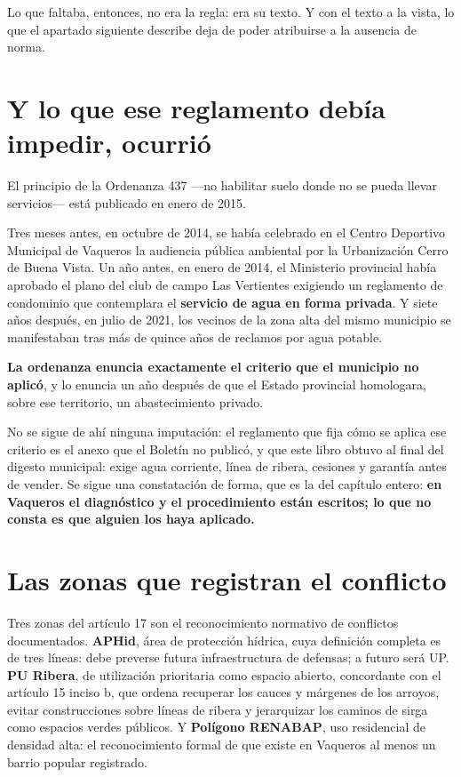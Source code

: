 Lo que faltaba, entonces, no era la regla: era su texto. Y con el texto a la vista, lo que el apartado siguiente describe deja de poder atribuirse a la ausencia de norma.


\section{Y lo que ese reglamento debía impedir, ocurrió}

El principio de la Ordenanza 437 ---no habilitar suelo donde no se pueda llevar servicios--- está publicado en
enero de 2015.

Tres meses antes, en octubre de 2014, se había celebrado en el Centro Deportivo Municipal de
Vaqueros la audiencia pública ambiental por la Urbanización Cerro de Buena Vista. Un año
antes, en enero de 2014, el Ministerio provincial había aprobado el plano del club de campo
Las Vertientes exigiendo un reglamento de condominio que contemplara el \textbf{servicio de
agua en forma privada}. Y siete años después, en julio de 2021, los vecinos de la zona alta
del mismo municipio se manifestaban tras más de quince años de reclamos por agua potable.

\textbf{La ordenanza enuncia exactamente el criterio que el municipio no aplicó}, y lo enuncia
un año después de que el Estado provincial homologara, sobre ese territorio, un
abastecimiento privado.

No se sigue de ahí ninguna imputación: el reglamento que fija cómo se aplica ese criterio es
el anexo que el Boletín no publicó, y que este libro obtuvo al final del digesto municipal:
exige agua corriente, línea de ribera, cesiones y garantía antes de vender. Se sigue una
constatación de forma, que es la del capítulo entero: \textbf{en Vaqueros el diagnóstico y el
procedimiento están escritos; lo que no consta es que alguien los haya aplicado.}

\section{Las zonas que registran el conflicto}

Tres zonas del artículo 17 son el reconocimiento normativo de conflictos documentados. \textbf{APHid}, área de protección hídrica, cuya definición completa es de tres líneas: debe preverse futura infraestructura de defensas; a futuro será UP. \textbf{PU Ribera}, de utilización prioritaria como espacio abierto, concordante con el artículo 15 inciso b, que ordena recuperar los cauces y márgenes de los arroyos, evitar construcciones sobre líneas de ribera y jerarquizar los caminos de sirga como espacios verdes públicos. Y \textbf{Polígono RENABAP}, uso residencial de densidad alta: el reconocimiento formal de que existe en Vaqueros al menos un barrio popular registrado.

